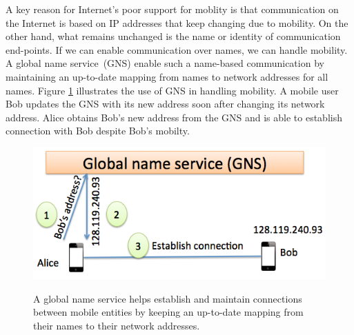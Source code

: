 
A key reason for Internet's poor support for moblity is that communication on the Internet is based on IP addresses that keep changing due to mobility. On the other hand, what remains unchanged is the name or identity of communication end-points. If we can enable communication over names, we can handle mobility. A  global name service (GNS) enable such a name-based communication by maintaining an up-to-date mapping from names to network addresses for all names. Figure \ref{fig:gns-example} illustrates the use of GNS in handling mobility. A mobile user Bob updates the GNS with its new address soon after changing its network address. Alice obtains Bob's new address from the GNS and is able to establish connection with Bob despite Bob's mobilty.

\begin{figure}
	\centering
	\includegraphics[scale=0.4]{fig/gns-example.png}
	\label{fig:gns-example}
	\caption{A global name service helps establish and maintain connections between mobile entities by keeping an up-to-date mapping from their names to their network addresses. }
\end{figure}

